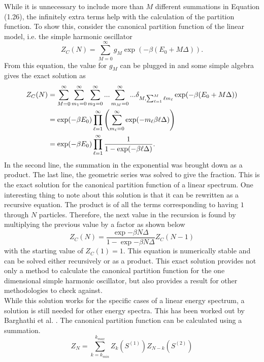 While it is unnecessary to include more than $M$ different summations in Equation (1.26), the infinitely extra terms help with the calculation of the partition function. To show this, consider the canonical partition function of the linear model, i.e. the simple harmonic oscillator
\begin{equation}
    Z_C(N)=\sum_{M=0}^{\infty} g_M \exp(-\beta(E_0+M\Delta)).
\end{equation}
From this equation, the value for $g_M$ can be plugged in and some simple algebra gives the exact solution as \cite{Schon1996}
\begin{align}
    Z_C(N)&=\sum_{M=0}^{\infty} \sum_{m_1=0}^{\infty}\sum_{m_2=0}^{\infty}...\sum_{m_M=0}^{\infty}... \delta_{M,\sum_{\ell=1}^M \ell m_{\ell}} \exp(-\beta(E_0+M\Delta))\nonumber\\
    &=\exp(-\beta E_0) \prod_{\ell=1}^{\infty}\qty(\sum_{m_{\ell}=0}^{\infty} \exp(-m_{\ell}\beta \ell\Delta))\nonumber\\
    &=\exp(-\beta E_0) \prod_{\ell=1}^{\infty} \frac{1}{1-\exp(-\beta \ell\Delta)}.
\end{align}
In the second line, the summation in the exponential was brought down as a product. The last line, the geometric series was solved to give the fraction. This is the exact solution for the canonical partition function of a linear spectrum. One interesting thing to note about this solution is that it can be rewritten as a recursive equation. The product is of all the terms corresponding to having $1$ through $N$ particles. Therefore, the next value in the recursion is found by multiplying the previous value by a factor as shown below
\begin{equation}
    Z_C(N)=\frac{\exp{-\beta N\Delta}}{1-\exp{-\beta N\Delta}}Z_C(N-1)
\end{equation}
with the starting value of $Z_C(1)=1$. This equation is numerically stable and can be solved either recursively or as a product. 
This exact solution provides not only a method to calculate the canonical partition function for the one dimensional simple harmonic oscillator, but also provides a result for other methodologies to check against.\\
While this solution works for the specific cases of a linear energy spectrum, a solution is still needed for other energy spectra. This has been worked out by Barghathi et al. \cite{Hatem2020}. The canonical partition function can be calculated using a summation.
\begin{equation}
    Z_N=\sum_{k=k_{min}}^{k_{max}} Z_k(S^{(1)})Z_{N-k}(S^{(2)})
\end{equation}

